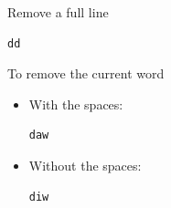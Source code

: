 \documentclass{article}
\newenvironment{codetemplate}[1][]{%
  \mybasecolorbox[#1]
  \itshape
}{%
  \endmybasecolorbox
}
\begin{document}
Remove a full line
\begin{codetemplate}{}
\begin{verbatim}
dd
\end{verbatim}
\end{codetemplate}

To remove the current word
\begin{itemize}
    \item With the spaces:
\begin{codetemplate}
\begin{verbatim}
daw
\end{verbatim}
\end{codetemplate}
    \item Without the spaces:
\begin{codetemplate}
\begin{verbatim}
diw
\end{verbatim}
\end{codetemplate}
\end{itemize}
\end{document}
